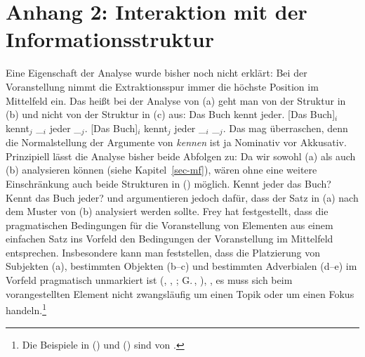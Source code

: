 \section{Anhang 2: Interaktion mit der Informationsstruktur}
\label{sec-udc-is}

Eine Eigenschaft der Analyse wurde bisher noch nicht erklärt: Bei der Voranstellung nimmt
die Extraktionsspur immer die höchste Position im Mittelfeld ein. Das heißt bei der Analyse
von (a) geht man von der Struktur in (b) und nicht von der Struktur in (c) aus:
\eal
\ex Das Buch kennt jeder.
\ex {}[Das Buch]$_i$ kennt$_j$ \_$_i$ jeder \_$_j$.
\ex {}[Das Buch]$_i$ kennt$_j$ jeder \_$_i$ \_$_j$.
\zl
Das mag überraschen, denn die Normalstellung der Argumente von \emph{kennen} ist ja Nominativ vor Akkusativ.
Prinzipiell lässt die Analyse bisher beide Abfolgen zu: Da wir sowohl (a) als auch (b)
analysieren können (siehe Kapitel~\ref{sec-mf}), wären ohne eine weitere Einschränkung
auch beide Strukturen in () möglich.%
\eal
\ex Kennt jeder das Buch?
\ex Kennt das Buch jeder?
\zl
\citet{Fanselow2003d} und \citet{Frey2004a} argumentieren jedoch dafür, dass der Satz in (a) nach dem
Muster von (b) analysiert werden sollte. Frey hat festgestellt, dass die pragmatischen
Bedingungen für die Voranstellung von Elementen aus einem einfachen Satz ins Vorfeld den Bedingungen der Voranstellung
im Mittelfeld entsprechen. Insbesondere kann man feststellen, dass die Platzierung von Subjekten (a), 
bestimmten Objekten (b--c) und bestimmten Adverbialen (d--e) im Vorfeld pragmatisch
unmarkiert 
ist (\citealp{Lenerz77}, \citealp[--74]{Haider84c}, \citealp{Fanselow2003d};
G.\,\citealp[]{GMueller2004a}, \citealp{Frey2004a}), 
\dash, es muss sich beim vorangestellten Element nicht zwangsläufig 
um einen Topik oder um einen Fokus handeln.\footnote{
  Die Beispiele in () und () sind von \citet[--6, 8]{Frey2004a}. 
}

